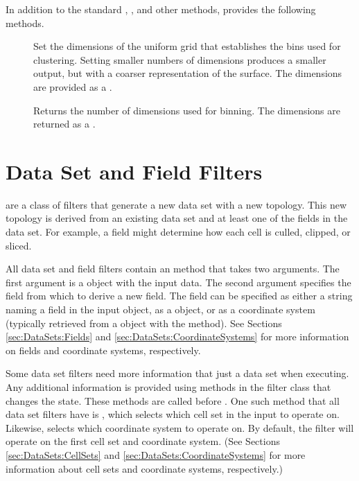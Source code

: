 In addition to the standard ,
, and other methods,
 provides the following methods.

\begin{description}
\item[] Set the dimensions of the uniform
  grid that establishes the bins used for clustering. Setting smaller
  numbers of dimensions produces a smaller output, but with a coarser
  representation of the surface. The dimensions are provided as a
  .
\item[] Returns the number of dimensions
  used for binning. The dimensions are returned as a .
\end{description}



\section{Data Set and Field Filters}


 are a class of filters that generate a
new data set with a new topology. This new topology is derived from an
existing data set and at least one of the fields in the data set. For
example, a field might determine how each cell is culled, clipped, or
sliced.

All data set and field filters contain an  method that
takes two arguments. The first argument is a  object with
the input data. The second argument specifies the field from which to
derive a new field. The field can be specified as either a string naming a
field in the input  object, as a 
object, or as a coordinate system (typically retrieved from a
 object with the 
method). See Sections \ref{sec:DataSets:Fields} and
\ref{sec:DataSets:CoordinateSystems} for more information on fields and
coordinate systems, respectively.

Some data set filters need more information that just a data set when
executing. Any additional information is provided using methods in the
filter class that changes the state. These methods are called before
. One such method that all data set filters have is
, which selects which cell set in the input
 to operate on. Likewise,
 selects which coordinate system to
operate on. By default, the filter will operate on the first cell set and
coordinate system. (See Sections \ref{sec:DataSets:CellSets} and
\ref{sec:DataSets:CoordinateSystems} for more information about cell sets
and coordinate systems, respectively.)

